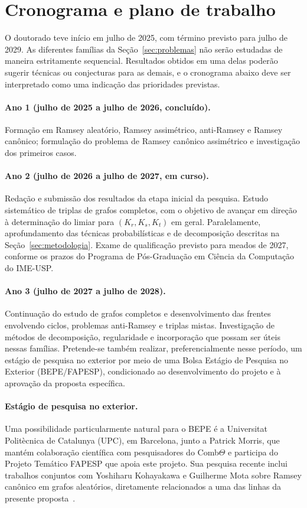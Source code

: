 \documentclass[11pt,a4paper]{article}
\theoremstyle{plain}
\theoremstyle{definition}
\begin{document}
\section{Cronograma e plano de trabalho}


O doutorado teve início em julho de 2025, com término previsto para julho de
2029. As diferentes famílias da Seção~\ref{sec:problemas} não serão estudadas
de maneira estritamente sequencial. Resultados obtidos em uma delas poderão
sugerir técnicas ou conjecturas para as demais, e o cronograma abaixo deve ser
interpretado como uma indicação das prioridades previstas.

\paragraph{Ano 1 (julho de 2025 a julho de 2026, concluído).}
Formação em Ramsey aleatório, Ramsey assimétrico, anti-Ramsey e Ramsey
canônico; formulação do problema de Ramsey canônico assimétrico e investigação
dos primeiros casos.

\paragraph{Ano 2 (julho de 2026 a julho de 2027, em curso).}
Redação e submissão dos resultados da etapa inicial da pesquisa. Estudo
sistemático de triplas de grafos completos, com o objetivo de avançar em
direção à determinação do limiar para $(K_r,K_s,K_t)$ em geral. Paralelamente,
aprofundamento das técnicas probabilísticas e de decomposição descritas na
Seção~\ref{sec:metodologia}. Exame de qualificação previsto para meados de
2027, conforme os prazos do Programa de Pós-Graduação em Ciência da Computação
do IME-USP.

\paragraph{Ano 3 (julho de 2027 a julho de 2028).}
Continuação do estudo de grafos completos e desenvolvimento das frentes
envolvendo ciclos, problemas anti-Ramsey e triplas mistas. Investigação de
métodos de decomposição, regularidade e incorporação que possam ser úteis
nessas famílias. Pretende-se também realizar, preferencialmente nesse período,
um estágio de pesquisa no exterior por meio de uma Bolsa Estágio de Pesquisa
no Exterior (BEPE/FAPESP), condicionado ao desenvolvimento do projeto e à
aprovação da proposta específica.

\paragraph{Estágio de pesquisa no exterior.}
Uma possibilidade particularmente natural para o BEPE é a Universitat
Politècnica de Catalunya (UPC), em Barcelona, junto a Patrick Morris, que
mantém colaboração científica com pesquisadores do Comb$\Theta$ e participa
do Projeto Temático FAPESP que apoia este projeto. Sua pesquisa recente inclui
trabalhos conjuntos com Yoshiharu Kohayakawa e Guilherme Mota sobre Ramsey
canônico em grafos aleatórios, diretamente relacionados a uma das linhas da
presente proposta~\cite{AKMM}.
\end{document}
